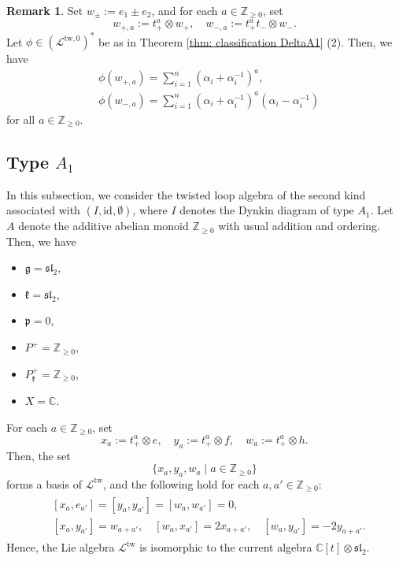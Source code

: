 \documentclass[12pt,a4paper]{amsart}
\theoremstyle{definition}
\newtheorem{rem}[thm]{Remark}
\numberwithin{equation}{subsection}
\begin{document}
\begin{rem}\label{rem: reform DeltaA1}
  Set $w_\pm := e_1 \pm e_2$, and for each $a \in \mathbb{Z}_{\geq 0}$, set
  \[
    w_{+,a} := t_+^a \otimes w_+, \quad w_{-,a} := t_+^a t_- \otimes w_-.
  \]
  Let $\phi \in (\mathcal{L}^{\mathrm{tw},0})^*$ be as in Theorem \ref{thm: classification DeltaA1} (2).
  Then, we have
  \begin{align*}
    &\phi(w_{+,a}) = \sum_{i=1}^n (\alpha_i + \alpha_i^{-1})^a, \\
    &\phi(w_{-,a}) = \sum_{i=1}^n (\alpha_i + \alpha_i^{-1})^a (\alpha_i - \alpha_i^{-1})
  \end{align*}
  for all $a \in \mathbb{Z}_{\geq 0}$.
\end{rem}

\subsection{Type $A_1$}
In this subsection, we consider the twisted loop algebra of the second kind associated with $(I,\mathrm{id},\emptyset)$, where
$I$ denotes the Dynkin diagram of type $A_1$.
Let $A$ denote the additive abelian monoid $\mathbb{Z}_{\geq 0}$ with usual addition and ordering.
Then, we have
\begin{itemize}
  \item $\mathfrak{g} = \mathfrak{sl}_2$,
  \item $\mathfrak{k} = \mathfrak{sl}_2$,
  \item $\mathfrak{p} = 0$,
  \item $P^+ = \mathbb{Z}_{\geq 0}$,
  \item $P_\mathfrak{k}^+ = \mathbb{Z}_{\geq 0}$,
  \item $X = \mathbb{C}$.
\end{itemize}

For each $a \in \mathbb{Z}_{\geq 0}$, set
\[
  x_a := t_+^a \otimes e, \quad y_a := t_+^a \otimes f, \quad w_a := t_+^a \otimes h.
\]
Then, the set
\[
  \{ x_a,y_a,w_a \mid a \in \mathbb{Z}_{\geq 0} \}
\]
forms a basis of $\mathcal{L}^\mathrm{tw}$, and the following hold for each $a,a' \in \mathbb{Z}_{\geq 0}$:
\begin{align}\label{eq: mul table A1}
  \begin{split}
    &[x_a,e_{a'}] = [y_a,y_{a'}] = [w_a,w_{a'}] = 0,\\
    &[x_a,y_{a'}] = w_{a+a'},
    \quad
    [w_a,x_{a'}] = 2x_{a+a'},
    \quad
    [w_a,y_{a'}] = -2y_{a+a'}.
  \end{split}
\end{align}
Hence, the Lie algebra $\mathcal{L}^{\mathrm{tw}}$ is isomorphic to the current algebra $\mathbb{C}[t] \otimes \mathfrak{sl}_2$.
\end{document}
